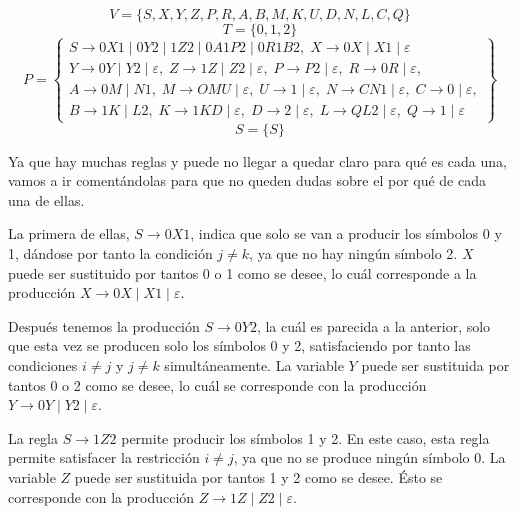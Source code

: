 \documentclass[11pt,a4paper]{article}
\begin{document}
		\[V = \lbrace S, X, Y, Z, P, R, A, B, M, K, U, D, N, L, C, Q \rbrace \]
		\[T = \lbrace 0, 1, 2 \rbrace \]
		\[P = \left\{
		\begin{array}{c}
			S \rightarrow 0X1 \; | \; 0Y2 \; | \; 1Z2 \; | \; 0A1P2 \; | \; 0R1B2, \;
			X \rightarrow 0X \; | \; X1 \; | \; \varepsilon \\
			Y \rightarrow 0Y \; | \; Y2 \; | \; \varepsilon, \;
			Z \rightarrow 1Z \; | \; Z2 \; | \; \varepsilon, \;
			P \rightarrow P2 \; | \; \varepsilon, \;
			R \rightarrow 0R \; | \; \varepsilon, \\
			A \rightarrow 0M \; | \; N1, \;
			M \rightarrow OMU \; | \; \varepsilon, \;
			U \rightarrow 1 \; | \; \varepsilon, \;
			N \rightarrow CN1 \; | \; \varepsilon, \;
			C \rightarrow 0 \; | \; \varepsilon, \\
			B \rightarrow 1K \; | \; L2, \;
			K \rightarrow 1KD \; | \; \varepsilon, \;
			D \rightarrow 2 \; | \; \varepsilon, \;
			L \rightarrow QL2 \; | \; \varepsilon, \;
			Q \rightarrow 1 \; | \; \varepsilon
		\end{array}
		\right\}\]
		\[S = \lbrace S \rbrace \]
		
		Ya que hay muchas reglas y puede no llegar a quedar claro para qué es cada una, vamos a ir 
		comentándolas para que no queden dudas sobre el por qué de cada una de ellas. \par
		
		La primera de ellas, $S \rightarrow 0X1$, indica que solo se van a producir los símbolos
		0 y 1, dándose por tanto la condición $j \neq k$, ya que no hay ningún símbolo 2. $X$ puede ser
		sustituido por tantos 0 o 1 como se desee, lo cuál corresponde a la producción $X \rightarrow 0X \;
		| \; X1 \; | \; \varepsilon$. \par
		
		Después tenemos la producción $S \rightarrow 0Y2$, la cuál es parecida a la anterior, solo que
		esta vez se producen solo los símbolos 0 y 2, satisfaciendo por tanto las condiciones $i \neq j$
		y $j \neq k$ simultáneamente. La variable $Y$ puede ser sustituida por tantos 0 o 2 como se desee,
		lo cuál se corresponde con la producción $Y \rightarrow 0Y \; | \; Y2 \; | \; \varepsilon$. \par
		
		La regla $S \rightarrow 1Z2$ permite producir los símbolos 1 y 2. En este caso, esta regla permite
		satisfacer la restricción $i \neq j$, ya que no se produce ningún símbolo 0. La variable $Z$ puede
		ser sustituida por tantos 1 y 2 como se desee. Ésto se corresponde con la producción $Z \rightarrow 1Z
		\; | \; Z2 \; | \; \varepsilon$. \par
		
\end{document}
